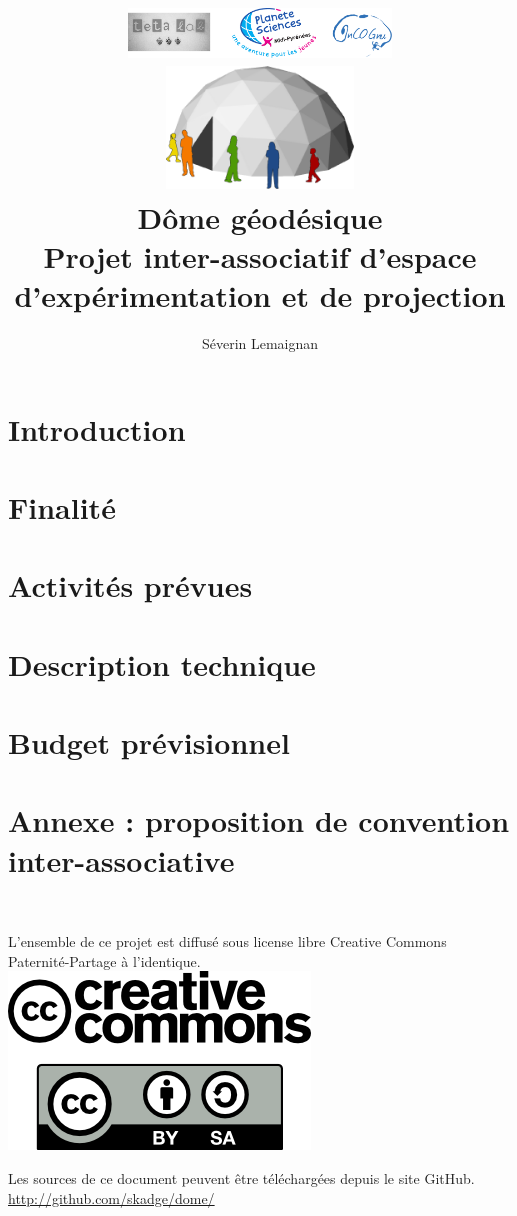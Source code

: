 \documentclass[a4paper,12pt]{book}
\title{
	\includegraphics[width=7cm]{logos.pdf}\\
	\vfill
	\includegraphics[width=5cm]{general.pdf}\\
	\vspace{3em}
	\LARGE{\textbf{Dôme géodésique}}\\[1cm]
	\large{Projet inter-associatif d'espace d'expérimentation et de projection}\\[1cm]
	\vfill
}
\author{
Séverin Lemaignan
}
\begin{document}

\maketitle

\tableofcontents


\chapter{Introduction}

\chapter{Finalité}

\chapter{Activités prévues}

\chapter{Description technique}

\chapter{Budget prévisionnel}

\chapter{Annexe : proposition de convention inter-associative}


\clearpage
\thispagestyle{empty}
~
\vfill
\begin{center}
	L'ensemble de ce projet est diffusé sous license libre Creative Commons Paternité-Partage à l'identique.\\
	\vspace{2cm}
	\includegraphics[scale=0.5]{logo_cc.png}
\end{center}

\vfill

\begin{center}
	Les sources de ce document peuvent être téléchargées depuis le site GitHub.
	\url{http://github.com/skadge/dome/}
\end{center}

\vfill
\end{document}
